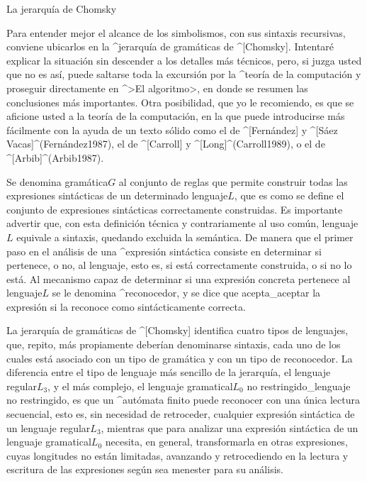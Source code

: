 \Section La jerarquía de Chomsky

Para entender mejor el alcance de los simbolismos, con sus sintaxis
recursivas, conviene ubicarlos en la ^{jerarquía de gramáticas} de
^[Chomsky]. Intentaré explicar la situación sin descender a los detalles
más técnicos, pero, si juzga usted que no es así, puede saltarse toda la
excursión por la ^{teoría de la computación} y proseguir directamente en
^>El algoritmo>, en donde se resumen las conclusiones más importantes.
Otra posibilidad, que yo le recomiendo, es que se aficione usted a la
teoría de la computación, en la que puede introducirse más fácilmente
con la ayuda de un texto sólido como el de ^[Fernández] y ^[Sáez
Vacas]^(Fernández1987), el de ^[Carroll] y ^[Long]^(Carroll1989), o el
de ^[Arbib]^(Arbib1987).

Se denomina \Mental gramática$G$ al conjunto de reglas que permite
construir todas las expresiones sintácticas de un determinado \Mental
lenguaje$L$, que es como se define el conjunto de expresiones
sintácticas correctamente construidas. Es importante advertir que, con
esta definición técnica y contrariamente al uso común, \mental
lenguaje$L$ equivale a sintaxis, quedando excluida la semántica. De
manera que el primer paso en el análisis de una ^{expresión sintáctica}
consiste en determinar si pertenece, o no, al lenguaje, esto es, si está
correctamente construida, o si no lo está. Al mecanismo capaz de
determinar si una expresión concreta pertenece al \mental lenguaje$L$ se
le denomina ^{reconocedor}, y se dice que acepta_{aceptar} la expresión
si la reconoce como sintácticamente correcta.

La jerarquía de gramáticas de ^[Chomsky] identifica cuatro tipos de
lenguajes, que, repito, más propiamente deberían denominarse sintaxis,
cada uno de los cuales está asociado con un tipo de gramática y con un
tipo de reconocedor. La diferencia entre el tipo de lenguaje más
sencillo de la jerarquía, el \Mental lenguaje regular$L_3$, y el más
 \hbox{complejo},
el \Mental lenguaje gramatical$L_0$ no restringido_{lenguaje
no restringido}, es que un ^{autómata} finito puede reconocer con una
única lectura secuencial, esto es, sin necesidad de retroceder,
cualquier expresión sintáctica de un \mental lenguaje regular$L_3$,
mientras que para analizar una expresión sintáctica de un \mental
lenguaje gramatical$L_0$ necesita, en general, transformarla en otras
expresiones, cuyas longitudes no están limitadas, avanzando y
retrocediendo en la lectura y escritura de las expresiones según sea
menester para su análisis.

